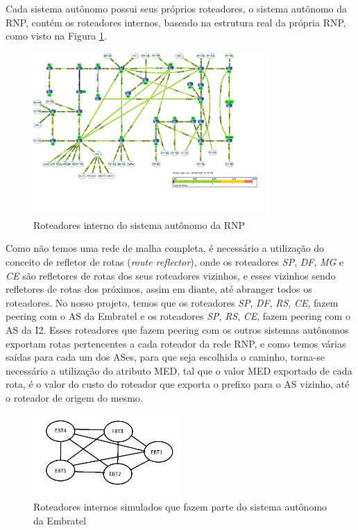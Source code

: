 \documentclass[12pt,a4paper]{report}
\begin{document}
Cada sistema aut\^onomo possui seus pr\'oprios roteadores, o sistema aut\^onomo da RNP, cont\'em os roteadores internos, baseado na estrutura real da pr\'opria RNP, como visto na Figura \ref{fig:rnp}. 

\begin{figure}[!htb]
 \centering
 \includegraphics[width=0.8\textwidth]{Imagens/rnp}
  \caption{\label{fig:rnp} Roteadores interno do sistema aut\^onomo da RNP}
\end{figure}

Como n\~ao temos uma rede de malha completa, \'e necess\'ario a utiliza\c{c}\~ao do conceito de refletor de rotas (\textit{route reflector}), onde os roteadores \textit{SP}, \textit{DF}, \textit{MG} e \textit{CE} s\~ao refletores de rotas dos seus roteadores vizinhos, e esses vizinhos sendo refletores de rotas dos pr\'oximos, assim em diante, at\'e abranger todos os roteadores. No nosso projeto, temos que os roteadores \textit{SP}, \textit{DF}, \textit{RS}, \textit{CE}, fazem peering com o AS da Embratel e os roteadores \textit{SP}, \textit{RS}, \textit{CE}, fazem peering com o AS da I2. Esses roteadores que fazem peering com os outros sistemas aut\^onomos exportam rotas pertencentes a cada roteador da rede RNP, e como temos v\'arias sa\'idas para cada um dos ASes, para que seja escolhida o caminho, torna-se necess\'ario a utiliza\c{c}\~ao do atributo MED, tal que o valor MED exportado de cada rota, \'e o valor do custo do roteador que exporta o prefixo para o AS vizinho, at\'e o roteador de origem do mesmo.

\begin{figure}[!htb]
 \centering
 \includegraphics[width=0.5\textwidth]{Imagens/EMBRATEL}
  \caption{\label{fig:Embratel} Roteadores internos simulados que fazem parte do sistema aut\^onomo da Embratel}
\end{figure}
\end{document}
